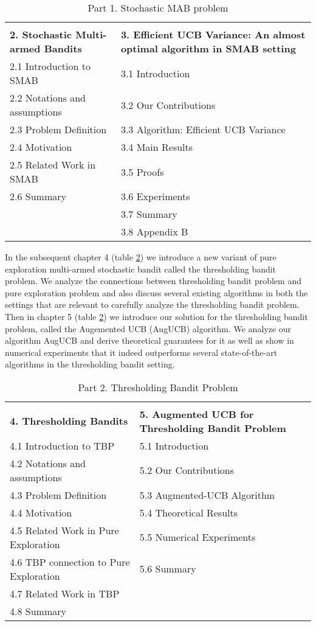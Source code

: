 \documentclass[MS,synopsis]{iitmdiss}
\begin{document}
\begin{table}[!th]
\begin{tabular}{p{16em}|p{16em}}
\hline\\
\textbf{2. Stochastic Multi-armed Bandits} & \textbf{3. Efficient UCB Variance: An almost optimal algorithm in SMAB setting}\\\hline
2.1 Introduction to SMAB & 3.1 Introduction\\
2.2 Notations and assumptions & 3.2 Our Contributions\\
2.3 Problem Definition & 3.3 Algorithm: Efficient UCB Variance\\
2.4 Motivation & 3.4 Main Results\\
2.5 Related Work in SMAB & 3.5 Proofs\\
2.6 Summary & 3.6 Experiments\\
& 3.7 Summary\\
& 3.8 Appendix B\\
\hline
\end{tabular}
\caption{Part 1. Stochastic MAB problem}
\label{tab:chap2-3}
\end{table}


In the subsequent chapter 4 (table \ref{tab:chap4-5})  we introduce a new variant of pure exploration multi-armed stochastic bandit called the thresholding bandit problem. We analyze the connections between thresholding bandit problem and pure exploration problem and also discuss several existing algorithms in both the settings that are relevant to carefully analyze the thresholding bandit problem. Then in chapter 5 (table \ref{tab:chap4-5}) we introduce our solution for the thresholding bandit problem, called the Augemented UCB (AugUCB) algorithm. We analyze our algorithm AugUCB and derive theoretical guarantees for it as well as show in numerical experiments that it indeed outperforms several state-of-the-art algorithms in the thresholding bandit setting. 


\begin{table}[!th]
\begin{tabular}{p{16em}|p{16em}}
\hline\\
\textbf{4. Thresholding Bandits} & \textbf{5. Augmented UCB for Thresholding Bandit Problem}\\\hline
4.1 Introduction to TBP & 5.1 Introduction\\
4.2 Notations and assumptions & 5.2 Our Contributions\\
4.3 Problem Definition & 5.3 Augmented-UCB Algorithm\\
4.4 Motivation & 5.4 Theoretical Results\\
4.5 Related Work in Pure Exploration & 5.5 Numerical Experiments\\
4.6 TBP connection to Pure Exploration & 5.6 Summary\\
4.7 Related Work in TBP &\\
4.8 Summary & \\
\hline
\end{tabular}
\caption{Part 2. Thresholding Bandit Problem}
\label{tab:chap4-5}
\end{table}
\end{document}
